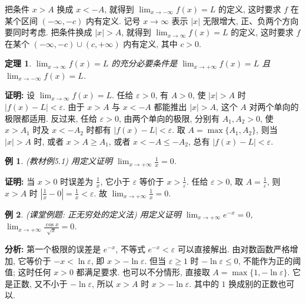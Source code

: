 \documentclass[UTF8,openany]{ctexbook}
\theoremstyle{chinesetextbook}
\newtheorem{example}{例}[section]
\newtheorem{theorem}{定理}[section]
\newenvironment{cnproof}{\par\indent\textbf{证明:} \ignorespaces}{\par}
\begin{document}
把条件 $x>A$ 换成 $x<-A$, 就得到 $\displaystyle\lim_{x\to-\infty}f(x)=L$ 的定义, 这时要求 $f$ 在某个区间 $(-\infty,-c)$ 内有定义. 记号 $x\to\infty$ 表示 $|x|$ 无限增大, 正、负两个方向要同时考虑. 把条件换成 $|x|>A$, 就得到 $\displaystyle\lim_{x\to\infty}f(x)=L$ 的定义, 这时要求 $f$ 在某个 $(-\infty,-c)\cup(c,+\infty)$ 内有定义, 其中 $c>0$.
\begin{theorem}
$\displaystyle\lim_{x\to\infty}f(x)=L$ 的充分必要条件是 $\displaystyle\lim_{x\to+\infty}f(x)=L$ 且 $\displaystyle\lim_{x\to-\infty}f(x)=L$.
\end{theorem}
\begin{cnproof}
设 $\displaystyle\lim_{x\to\infty}f(x)=L$. 任给 $\varepsilon>0$, 有 $A>0$, 使 $|x|>A$ 时 $|f(x)-L|<\varepsilon$. 由于 $x>A$ 与 $x<-A$ 都能推出 $|x|>A$, 这个 $A$ 对两个单向的极限都适用. 反过来, 任给 $\varepsilon>0$, 由两个单向的极限, 分别有 $A_1,A_2>0$, 使 $x>A_1$ 时及 $x<-A_2$ 时都有 $|f(x)-L|<\varepsilon$. 取 $A=\max\{A_1,A_2\}$, 则当 $|x|>A$ 时, 或者 $x>A\ge A_1$, 或者 $x<-A\le-A_2$, 总有 $|f(x)-L|<\varepsilon$.
\end{cnproof}
\begin{example}
\textnormal{(教材例5.1)} 用定义证明 $\displaystyle\lim_{x\to+\infty}\frac1x=0$.
\end{example}
\begin{cnproof}
当 $x>0$ 时误差为 $\displaystyle\frac1x$, 它小于 $\varepsilon$ 等价于 $\displaystyle x>\frac1\varepsilon$. 任给 $\varepsilon>0$, 取 $\displaystyle A=\frac1\varepsilon$, 则 $x>A$ 时 $\displaystyle\left|\frac1x-0\right|=\frac1x<\varepsilon$. 故 $\displaystyle\lim_{x\to+\infty}\frac1x=0$.
\end{cnproof}
\begin{example}
\textnormal{(课堂例题: 正无穷处的定义法)} 用定义证明 $\displaystyle\lim_{x\to+\infty}e^{-x}=0$, $\displaystyle\lim_{x\to+\infty}\frac{\cos x}{\sqrt x}=0$.
\end{example}
\par\indent\textbf{分析:} 第一个极限的误差是 $e^{-x}$, 不等式 $e^{-x}<\varepsilon$ 可以直接解出. 由对数函数严格增加, 它等价于 $-x<\ln\varepsilon$, 即 $x>-\ln\varepsilon$. 但当 $\varepsilon\ge1$ 时 $-\ln\varepsilon\le0$, 不能作为正的阈值; 这时任何 $x>0$ 都满足要求. 也可以不分情形, 直接取 $A=\max\{1,-\ln\varepsilon\}$. 它是正数, 又不小于 $-\ln\varepsilon$, 所以 $x>A$ 时 $x>-\ln\varepsilon$. 其中的 $1$ 换成别的正数也可以.
\end{document}
